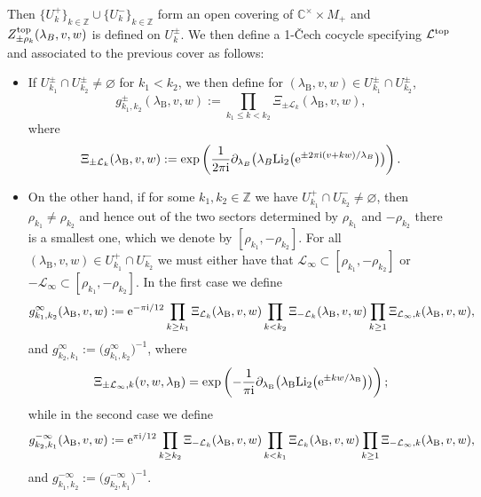 \documentclass[pdftex]{sigma}
\numberwithin{equation}{section}
\begin{document}
Then $\{U_k^+\}_{k\in \mathbb{Z}}\cup \{U_k^-\}_{k\in \mathbb{Z}}$ form an open covering of $\mathbb{C}^{\times}\times M_{+}$ and $Z^{{\rm top}}_{\pm \rho_k}(\lambda_B,v,w)$ is defined on $U_k^{\pm}$. We then define a 1-\v{C}ech cocycle specifying $\mathcal{L}^{{\rm top}}$ and associated to the previous cover as follows:
\begin{itemize}\itemsep=0pt
\item If $U_{k_1}^{\pm}\cap U_{k_2}^{\pm }\neq \varnothing$ for $k_1<k_2$, we then define for $(\lambda_{\mathrm B},v,w)\in U_{k_1}^{\pm}\cap U_{k_2}^{\pm }$,
\begin{equation*}
 g^{\pm}_{k_1,k_2}(\lambda_{\mathrm B},v,w):=\prod_{k_1\leq k < k_2}\Xi_{\pm \mathcal{L}_k}(\lambda_{\mathrm B},v,w),
\end{equation*}
where
\begin{equation*}
 \Xi_{\pm \mathcal{L}_k}(\lambda_{\mathrm B},v,w):=\exp \left(\frac{1}{2\pi \mathrm{i}}\partial_{\lambda_B}\big(\lambda_B\mathrm{Li}_2\big({\rm e}^{\pm 2\pi \mathrm{i}(v+kw)/\lambda_B}\big)\big)\right).
\end{equation*}

\item On the other hand, if for some $k_1,k_2\in \mathbb{Z}$ we have $U_{k_1}^{+}\cap U_{k_2}^{-}\neq \varnothing$, then $\rho_{k_1}\neq \rho_{k_2}$ and hence out of the two sectors determined by $\rho_{k_1}$ and $-\rho_{k_2}$ there is a smallest one, which we denote by $[\rho_{k_1},-\rho_{k_2}]$. For all $(\lambda_{\mathrm B},v,w)\in U_{k_1}^{+}\cap U_{k_2}^{-}$ we must either have that $\mathcal{L}_{\infty} \subset [\rho_{k_1},-\rho_{k_2}]$ or $- \mathcal{L}_{\infty} \subset [\rho_{k_1},-\rho_{k_2}]$. In the first case we define
\begin{equation*}%
 g_{k_1,k_2}^{\infty}(\lambda_{\mathrm B},v,w):={\rm e}^{-\pi\mathrm i/12}\prod_{k\geq k_1}\Xi_{\mathcal{L}_k}(\lambda_{\mathrm B},v,w)\prod_{k< k_2}\Xi_{-\mathcal{L}_{k}}(\lambda_{\mathrm B},v,w)\prod_{k\geq 1}\Xi_{\mathcal{L}_{\infty},k}(\lambda_{\mathrm B},v,w),
\end{equation*}
and $g_{k_2,k_1}^{\infty}:=\big(g_{k_1,k_2}^{\infty}\big)^{-1}$, where
\begin{equation*}
 \Xi_{\pm \mathcal{L}_{\infty},k}(v,w,\lambda_\mathrm B)=\exp\left(-\frac{1}{\pi \mathrm{i}}\partial_{\lambda_{\mathrm B}}\big(\lambda_{\mathrm B} \mathrm{Li}_2\big({\rm e}^{\pm kw/ \lambda_{\mathrm B}}\big)\big)\right) ;
\end{equation*}
while in the second case we define
\begin{equation*}%
 g_{k_2,k_1}^{-\infty}(\lambda_{\mathrm B},v,w):={\rm e}^{\pi \mathrm{i}/12}\prod_{k\geq k_2}\Xi_{-\mathcal{L}_{k}}(\lambda_{\mathrm B},v,w)\prod_{k< k_1}\Xi_{\mathcal{L}_{k}}(\lambda_{\mathrm B},v,w)\prod_{k\geq 1}\Xi_{-\mathcal{L}_{\infty},k}(\lambda_{\mathrm B},v,w),
\end{equation*}
and $g_{k_1,k_2}^{-\infty}:=\big(g_{k_2,k_1}^{-\infty}\big)^{-1}$.
\end{itemize}
\end{document}
